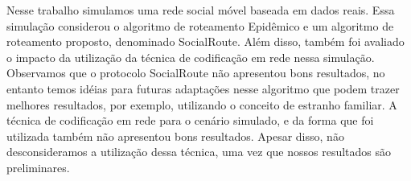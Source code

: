 \begin{resumo} 
Nesse trabalho simulamos uma rede social móvel baseada em dados reais.
Essa simulação considerou o algoritmo de roteamento Epidêmico e um
algoritmo de roteamento proposto, denominado SocialRoute. Além disso,
também foi avaliado o impacto da utilização da técnica de codificação em
rede nessa simulação. Observamos que o protocolo SocialRoute não
apresentou bons resultados, no entanto temos idéias para futuras
adaptações nesse algoritmo que podem trazer melhores resultados, por
exemplo, utilizando o conceito de estranho familiar. A técnica de
codificação em rede para o cenário simulado, e da forma que foi
utilizada também não apresentou bons resultados. Apesar disso, não
desconsideramos a utilização dessa técnica, uma vez que nossos
resultados são preliminares.
\end{resumo} 
